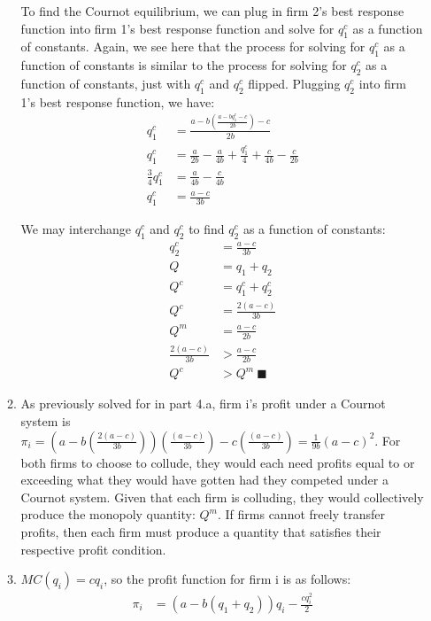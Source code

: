 \documentclass[12pt,letterpaper]{article}
\begin{document}
\begin{enumerate}
\begin{enumerate}
    To find the Cournot equilibrium, we can plug in firm 2's best response  function into firm 1's best response function and solve for $q_1^c$ as a function of constants. Again, we see here that the process for solving for $q_1^c$ as a function of constants is similar to the process for solving for $q_2^c$ as a function of constants, just with $q_1^c$ and $q_2^c$ flipped. Plugging $q_2^c$ into firm 1's best response function, we have:
    \begin{align*}
        q_1^c &= \frac{a - b(\frac{a - bq_1^c - c}{2b}) - c}{2b}\\
        q_1^c &= \frac{a}{2b} - \frac{a}{4b} + \frac{q_1^c}{4} + \frac{c}{4b} - \frac{c}{2b}\\
        \frac{3}{4}q_1^c &= \frac{a}{4b} - \frac{c}{4b}\\
        q_1^c &= \frac{a-c}{3b}
    \end{align*}
    
    We may interchange $q_1^c$ and $q_2^c$ to find $q_2^c$ as a function of constants:
    \begin{align*}
        q_2^c &= \frac{a-c}{3b}\\
        Q &= q_1 + q_2\\
        Q^c &= q_1^c + q_2^c\\
        Q^c &= \frac{2(a-c)}{3b}\\
        Q^m &= \frac{a-c}{2b}\\
        \frac{2(a-c)}{3b} &> \frac{a-c}{2b}\\
        Q^c &> Q^m \ \blacksquare
    \end{align*}
    
    \item As previously solved for in part 4.a, firm i's profit under a Cournot system is $\pi_i = (a-b(\frac{2(a-c)}{3b}))(\frac{(a-c)}{3b}) - c(\frac{(a-c)}{3b}) = \frac{1}{9b}(a-c)^2$. For both firms to choose to collude, they would each need profits equal to or exceeding what they would have gotten had they competed under a Cournot system. Given that each firm is colluding, they would collectively produce the monopoly quantity: $Q^m$. If firms cannot freely transfer profits, then each firm must produce a quantity that satisfies their respective profit condition.
    
    \item $MC(q_i) = cq_i$, so the profit function for firm i is as follows:
    \begin{align*}
        \pi_i &= (a - b(q_1 + q_2))q_i - \frac{cq_i^2}{2}
    \end{align*}
    

\end{enumerate}
\end{enumerate}
\end{document}
